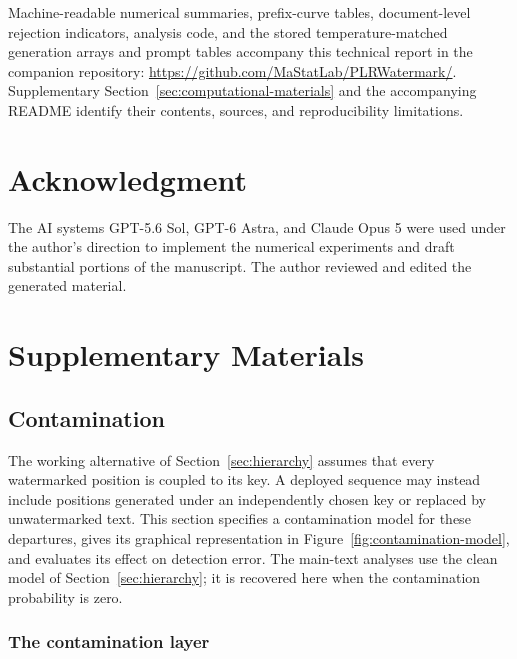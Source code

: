 \documentclass[11pt]{article}
\begin{document}
Machine-readable numerical summaries, prefix-curve tables, document-level
rejection indicators, analysis code, and the stored temperature-matched
generation arrays and prompt tables accompany this technical report in the
companion repository:
\url{https://github.com/MaStatLab/PLRWatermark/}.
Supplementary Section~\ref{sec:computational-materials} and the accompanying
README identify their contents, sources, and reproducibility limitations.

\section*{Acknowledgment}

The AI systems GPT-5.6 Sol, GPT-6 Astra, and Claude Opus 5 were used under the author's direction to implement the numerical experiments and draft substantial portions of the manuscript.  The author reviewed and edited the generated material.




\clearpage
\appendix
\section{Supplementary Materials}
\label{sec:supplementary}

\setcounter{equation}{0}
\renewcommand{\theequation}{S\arabic{equation}}
\renewcommand{\theHequation}{S\arabic{equation}}
\setcounter{algorithm}{0}
\renewcommand{\thealgorithm}{S\arabic{algorithm}}

\FloatBarrier
\subsection{Contamination}
\label{sec:contamination-supplement}

The working alternative of Section~\ref{sec:hierarchy} assumes that every
watermarked position is coupled to its key.  A deployed sequence may instead
include positions generated under an independently chosen key or replaced by
unwatermarked text.  This section specifies a contamination model for these
departures, gives its graphical representation in
Figure~\ref{fig:contamination-model}, and evaluates its effect on detection error.
The main-text analyses use the clean model of Section~\ref{sec:hierarchy}; it is
recovered here when the contamination probability is zero.


\subsubsection{The contamination layer}
\label{sec:contamination-model}
\end{document}
